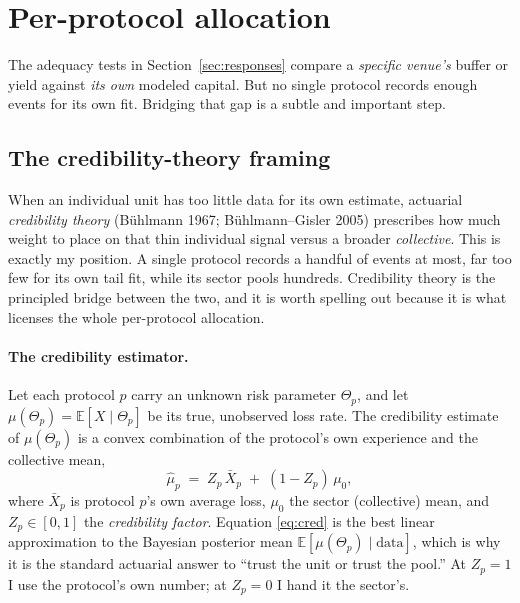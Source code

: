 \documentclass[11pt]{article}
\theoremstyle{definition}
\theoremstyle{remark}
\theoremstyle{definition}
\newcommand{\E}{\mathbb{E}}
\newcommand{\1}{\mathbf{1}}
\begin{document}
\section{Per-protocol allocation}\label{sec:allocation}

The adequacy tests in Section~\ref{sec:responses} compare a \emph{specific venue's}
buffer or yield against \emph{its own} modeled capital. But no single protocol
records enough events for its own fit. Bridging that gap is a subtle and
important step.

\subsection{The credibility-theory framing}

When an individual unit has too little data for its own estimate, actuarial
\emph{credibility theory} (B\"uhlmann 1967; B\"uhlmann--Gisler 2005) prescribes
how much weight to place on that thin individual signal versus a broader
\emph{collective}. This is exactly my position. A single protocol records a
handful of events at most, far too few for its own tail fit, while its sector
pools hundreds. Credibility theory is the principled bridge between the two, and
it is worth spelling out because it is what licenses the whole per-protocol
allocation.

\paragraph{The credibility estimator.}
Let each protocol $p$ carry an unknown risk parameter $\Theta_p$, and let
$\mu(\Theta_p)=\E[X\mid\Theta_p]$ be its true, unobserved loss rate. The
credibility estimate of $\mu(\Theta_p)$ is a convex combination of the protocol's
own experience and the collective mean,
\begin{equation}\label{eq:cred}
\hat\mu_p \;=\; Z_p\,\bar X_p \;+\; (1-Z_p)\,\mu_0,
\end{equation}
where $\bar X_p$ is protocol $p$'s own average loss, $\mu_0$ the sector
(collective) mean, and $Z_p\in[0,1]$ the \emph{credibility factor}. Equation
\eqref{eq:cred} is the best linear approximation to the Bayesian posterior mean
$\E[\mu(\Theta_p)\mid\text{data}]$, which is why it is the standard actuarial
answer to ``trust the unit or trust the pool.'' At $Z_p=1$ I use the protocol's
own number; at $Z_p=0$ I hand it the sector's.
\end{document}
